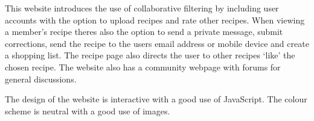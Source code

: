 This website introduces the use of collaborative filtering by including user accounts with the option to upload recipes and rate other recipes. When viewing a member’s recipe theres also the option to send a private message, submit corrections, send the recipe to the users email address or mobile device and create a shopping list. The recipe page also directs the user to other recipes ‘like’ the chosen recipe. The website also has a community webpage with forums for general discussions. 

The design of the website is interactive with a good use of JavaScript. The colour scheme is neutral with a good use of images.

